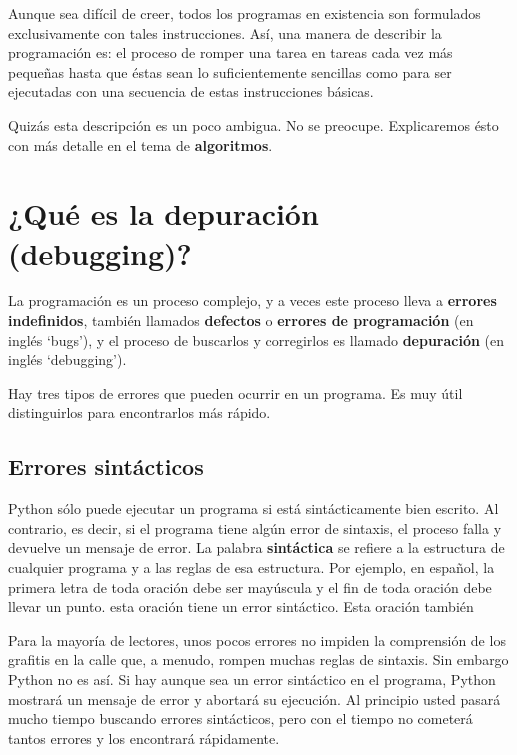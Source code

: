 Aunque sea difícil de creer, todos los programas en existencia son
formulados exclusivamente con tales instrucciones. Así, una manera
de describir la programación es: el proceso de romper una tarea en
tareas cada vez más pequeñas hasta que éstas sean lo
suficientemente sencillas como para ser ejecutadas con una secuencia
de estas instrucciones básicas.

Quizás esta descripción es un poco ambigua. No se preocupe.
Explicaremos ésto con más detalle en el tema de {\bf algoritmos}.

\section{¿Qué es la depuración (debugging)?}

La programación es un proceso complejo, y a veces este proceso
lleva a {\bf errores indefinidos}, también llamados {\bf defectos}
o {\bf errores de programación} (en inglés `bugs'), y el proceso de
buscarlos y corregirlos es llamado {\bf depuración} (en inglés
`debugging').

Hay tres tipos de errores que pueden ocurrir en un programa. Es
muy útil distinguirlos para encontrarlos más rápido.

\subsection{Errores sintácticos}

Python sólo puede ejecutar un programa si está sintácticamente
bien escrito. Al contrario, es decir, si el programa
tiene algún error de sintaxis, el proceso falla y devuelve un
mensaje de error. La palabra {\bf sintáctica} se refiere a la
estructura de cualquier programa y a las reglas de esa estructura.
 Por ejemplo, en español, la primera letra de
toda oración debe ser mayúscula y el fin de toda oración debe llevar un punto. 
esta oración tiene un error sintáctico. Esta oración también

Para la mayoría de lectores, unos pocos errores no impiden la
comprensión de los grafitis en la calle que, a menudo, rompen muchas
reglas de sintaxis. Sin embargo Python no es así. Si hay aunque
sea un error sintáctico en el programa, Python mostrará un mensaje
de error y abortará su ejecución. Al principio usted
pasará mucho tiempo buscando errores sintácticos, pero con el
tiempo no cometerá tantos errores y los encontrará rápidamente.

